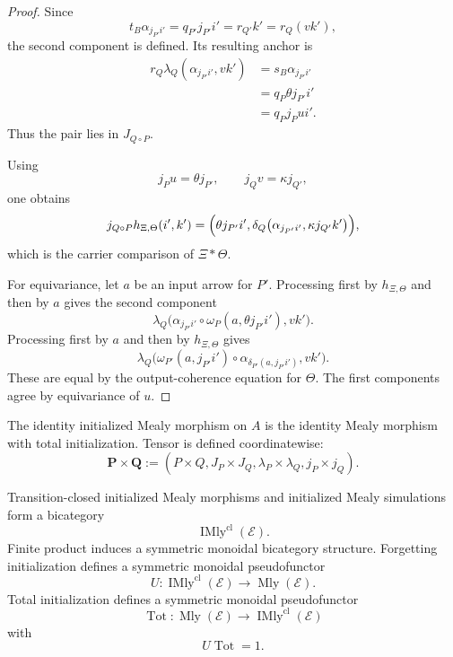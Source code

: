 \begin{proof}
Since
\[
  t_B\alpha_{j_{P'}i'}
  =
  q_{P'}j_{P'}i'
  =
  r_{Q'}k'
  =
  r_Q(vk'),
\]
the second component is defined. Its resulting anchor is
\[
\begin{aligned}
  r_Q\lambda_Q(\alpha_{j_{P'}i'},vk')
  &=
  s_B\alpha_{j_{P'}i'}
  \\
  &=
  q_P\theta j_{P'}i'
  \\
  &=
  q_Pj_Pui'.
\end{aligned}
\]
Thus the pair lies in \(J_{Q\circ P}\).

Using
\[
  j_Pu=\theta j_{P'},
  \qquad
  j_Qv=\kappa j_{Q'},
\]
one obtains
\[
  j_{Q\circ P}h_{\Xi,\Theta}(i',k')
  =
  \Bigl(
    \theta j_{P'}i',
    \delta_Q
    \bigl(
      \alpha_{j_{P'}i'},
      \kappa j_{Q'}k'
    \bigr)
  \Bigr),
\]
which is the carrier comparison of \(\Xi\ast\Theta\).

For equivariance, let \(a\) be an input arrow for \(P'\). Processing first by
\(h_{\Xi,\Theta}\) and then by \(a\) gives the second component
\[
  \lambda_Q
  \bigl(
    \alpha_{j_{P'}i'}
    \circ
    \omega_P(a,\theta j_{P'}i'),
    vk'
  \bigr).
\]
Processing first by \(a\) and then by \(h_{\Xi,\Theta}\) gives
\[
  \lambda_Q
  \bigl(
    \omega_{P'}(a,j_{P'}i')
    \circ
    \alpha_{\delta_{P'}(a,j_{P'}i')},
    vk'
  \bigr).
\]
These are equal by the output-coherence equation for \(\Theta\). The first components agree by
equivariance of \(u\).
\end{proof}

The identity initialized Mealy morphism on \(A\) is the identity Mealy morphism with total
initialization. Tensor is defined coordinatewise:
\[
  \mathbf P\times\mathbf Q
  :=
  (P\times Q,J_P\times J_Q,\lambda_P\times\lambda_Q,j_P\times j_Q).
\]

\begin{theorem}
\label{thm:initialized-mealy-bicategory}
Transition-closed initialized Mealy morphisms and initialized Mealy simulations form a bicategory
\[
  \operatorname{IMly}^{\mathrm{cl}}(\mathcal E).
\]
Finite product induces a symmetric monoidal bicategory structure. Forgetting initialization defines
a symmetric monoidal pseudofunctor
\[
  U:
  \operatorname{IMly}^{\mathrm{cl}}(\mathcal E)
  \longrightarrow
  \operatorname{Mly}(\mathcal E).
\]
Total initialization defines a symmetric monoidal pseudofunctor
\[
  \operatorname{Tot}:
  \operatorname{Mly}(\mathcal E)
  \longrightarrow
  \operatorname{IMly}^{\mathrm{cl}}(\mathcal E)
\]
with
\[
  U\operatorname{Tot}=1.
\]
\end{theorem}

